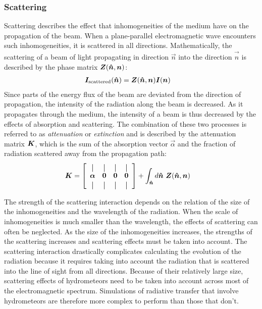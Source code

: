 \subsubsection{Scattering}

Scattering describes the effect that inhomogeneities of the medium have on the
propagation of the beam. When a plane-parallel electromagnetic wave encounters
such inhomogeneities, it is scattered in all directions. Mathematically, the
scattering of a beam of light propagating in direction $\vec{n}$ into the
direction $\vec{\hat{n}}$ is described by the phase matrix
$\bm{Z}(\bm{\hat{n}}, \bm{n})$:
\begin{align}
  \bm{I}_\text{scattered}(\bm{\hat{n}}) &= \bm{Z}(\bm{\hat{n}}, \bm{n}) \bm{I}(\bm{n})
\end{align}
Since parts of the energy flux of the beam are deviated from the direction of
propagation, the intensity of the radiation along the beam is decreased. As it
propagates through the medium, the intensity of a beam is thus decreased by the
effects of absorption and scattering. The combination of these two processes is
referred to as \textit{attenuation} or \textit{extinction} and is described by
the attenuation matrix $\bm{K}$, which is the sum of the absorption vector
$\vec{\alpha}$ and the fraction of radiation scattered away from the propagation
path:
\newcommand*{\vertbar}{\rule[-1ex]{0.5pt}{2.5ex}}
\newcommand*{\horzbar}{\rule[.5ex]{2.5ex}{0.5pt}}
\begin{align}
  \vec{K} &=
  \left [ \begin{array}{cccc}
      \vertbar & \vertbar & \vertbar & \vertbar \\
      \vec{\alpha} & \vec{0} & \vec{0} & \vec{0} \\
      \vertbar & \vertbar & \vertbar & \vertbar
    \end{array} \right ]
       + \int_{\vec{\hat{n}}} d\vec{\hat{n}}\ \mat{Z}(\vec{\hat{n}}, \vec{n})
\end{align}

The strength of the scattering interaction depends on the relation of the size
of the inhomogeneities and the wavelength of the radiation. When the scale of
inhomogeneities is much smaller than the wavelength, the effects of scattering
can often be neglected. As the size of the inhomogeneities increases, the
strengths of the scattering increases and scattering effects must be taken into
account. The scattering interaction drastically complicates calculating the
evolution of the radiation because it requires taking into account the radiation
that is scattered into the line of sight from all directions. Because of their
relatively large size, scattering effects of hydrometeors need to be taken into
account across most of the electromagnetic spectrum. Simulations of radiative
transfer that involve hydrometeors are therefore more complex to perform than
those that don't.


